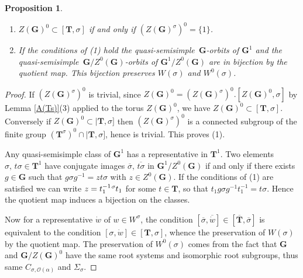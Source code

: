 \documentclass{amsart}
\newtheorem{proposition}[equation]{Proposition}
\numberwithin{equation}{section}
\theoremstyle{definition}
\theoremstyle{remark}
\newcommand\bG{{\mathbf G}}
\newcommand\bT{{\mathbf T}}
\newcommand\CO{{\mathcal O}}
\newcommand\Gun{{\bG^1}}
\newcommand\Tun{{\bT^1}}
\newcommand\Tso{{(\bT^\sigma)^0}}
\newcommand\Zso{{(Z(\bG)^\sigma)^0}}
\newcommand\tW{{\widetilde W}}
\newcommand\lexp[2]{\kern\scriptspace\vphantom{#2}^{#1}\kern-\scriptspace#2}
\newcommand\inv{^{-1}}
\newcommand\qss{quasi-semisimple}
\begin{document}
\begin{proposition}\label{Zso=1}~
\begin{enumerate}
\item  $Z(\bG)^0\subset[\bT,\sigma]$ if and only if $\Zso=\{1\}$.
\item If the conditions of (1) hold the \qss\ $\bG$-orbits
of $\Gun$ and the \qss\ $\bG/Z^0(\bG)$-orbits
of $\Gun/Z^0(\bG)$ are in bijection by the quotient map.
This bijection preserves $W(\sigma)$ and $W^0(\sigma)$.
\end{enumerate}
\end{proposition}
\begin{proof}
If  $\Zso$  is  trivial,  since  $Z(\bG)^0=\Zso.[Z(\bG)^0,\sigma]$ by
Lemma \ref{A(Ts)}(3) applied to the torus $Z(\bG)^0$, we have
$Z(\bG)^0\subset[\bT,\sigma]$.  Conversely if $Z(\bG)^0\subset|\bT,\sigma]$
then $\Zso$ is a connected subgroup of the finite group $\Tso\cap|\bT,\sigma]$,
hence is  trivial. This proves  (1). 

Any  quasi-semisimple class of  $\Gun$ has a  representative in $\Tun$. Two
elements $\sigma,\,t\sigma\in\Tun$ have conjugate images
$\overline\sigma,\,\overline{t\sigma}$  in  $\Gun/Z^0(\bG)$  if  and  only if
there   exists  $g\in\bG$  such  that  $g\sigma g\inv=zt\sigma$  with  $z\in
Z^0(\bG)$. If the conditions of (1) are satisfied we can write $z=t_1\inv\lexp\sigma t_1$
for some $t\in\bT$, so that $t_1g\sigma g\inv t_1\inv=t\sigma$. Hence 
the quotient map induces a bijection on the classes.

Now  for a representative $\dot w$ of $w\in W^\sigma$, the condition
$[\overline\sigma,\overline{\dot  w}]\in [\overline\bT,\overline\sigma]$ is
equivalent  to the  condition $[\sigma,\dot  w]\in[\bT,\sigma]$, whence the
preservation  of  $W(\sigma)$  by  the  quotient  map.  The preservation of
$W^0(\sigma)$  comes from the  fact that $\bG$  and $\bG/Z(\bG)^0$ have the
same root systems and isomorphic root subgroups, thus same
$C_{\sigma,\CO(\alpha)}$ and $\Sigma_\sigma$.
\end{proof}
\end{document}
